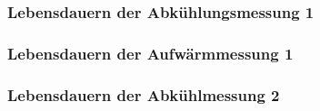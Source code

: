 \subsubsection{Lebensdauern der Abkühlungsmessung 1}
\subsubsection{Lebensdauern der Aufwärmmessung 1}
\subsubsection{Lebensdauern der Abkühlmessung 2}